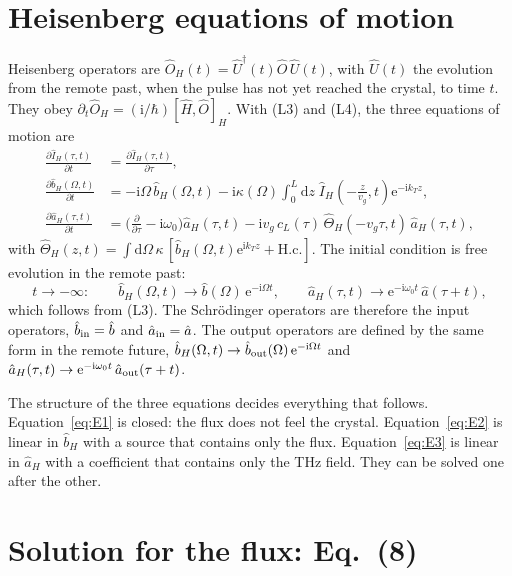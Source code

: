 \documentclass[aps,pra,onecolumn,notitlepage,11pt,amsmath,amssymb,nofootinbib]{revtex4-2}
\newcommand{\Iop}{\hat I}
\newcommand{\dd}{\mathrm{d}}
\newcommand{\ee}{\mathrm{e}}
\newcommand{\ii}{\mathrm{i}}
\begin{document}
\section{Heisenberg equations of motion}
\label{sec:eom}

Heisenberg operators are $\hat O_H(t)=\hat U^\dagger(t)\hat O\,\hat U(t)$, with
$\hat U(t)$ the evolution from the remote past, when the pulse has not yet
reached the crystal, to time $t$. They obey
$\partial_t\hat O_H=(\ii/\hbar)[\hat H,\hat O]_H$. With (L3) and (L4), the
three equations of motion are
\begin{align}
\frac{\partial\Iop_H(\tau,t)}{\partial t}
&=\frac{\partial\Iop_H(\tau,t)}{\partial\tau},
\label{eq:E1}\\
\frac{\partial\hat b_H(\Omega,t)}{\partial t}
&=-\ii\Omega\,\hat b_H(\Omega,t)
-\ii\kappa(\Omega)\int_0^L\!\!\dd z\;\Iop_H\!\left(-\frac{z}{v_g},t\right)\ee^{-\ii k_Tz},
\label{eq:E2}\\
\frac{\partial\hat a_H(\tau,t)}{\partial t}
&=\Big(\frac{\partial}{\partial\tau}-\ii\omega_0\Big)\hat a_H(\tau,t)
-\ii v_g\,c_L(\tau)\,\hat\Theta_H(-v_g\tau,t)\,\hat a_H(\tau,t),
\label{eq:E3}
\end{align}
with
$\hat\Theta_H(z,t)=\int\dd\Omega\,\kappa\,[\hat b_H(\Omega,t)\ee^{\ii k_Tz}+\mathrm{H.c.}]$.
The initial condition is free evolution in the remote past:
\begin{equation}
t\to-\infty:\qquad\hat b_H(\Omega,t)\to\hat b(\Omega)\,\ee^{-\ii\Omega t},\qquad
\hat a_H(\tau,t)\to\ee^{-\ii\omega_0t}\,\hat a(\tau+t),
\label{eq:past}
\end{equation}
which follows from (L3). The Schr\"odinger operators are therefore the input
operators, $\hat b_{\rm in}=\hat b$ and $\hat a_{\rm in}=\hat a$. The output
operators are defined by the same form in the remote future,
$\hat b_H(\Omega,t)\to\hat b_{\rm out}(\Omega)\,\ee^{-\ii\Omega t}$ and
$\hat a_H(\tau,t)\to\ee^{-\ii\omega_0t}\,\hat a_{\rm out}(\tau+t)$.

The structure of the three equations decides everything that follows.
Equation~\eqref{eq:E1} is closed: the flux does not feel the crystal.
Equation~\eqref{eq:E2} is linear in $\hat b_H$ with a source that contains
only the flux. Equation~\eqref{eq:E3} is linear in $\hat a_H$ with a
coefficient that contains only the THz field. They can be solved one after
the other.

\section{Solution for the flux: Eq.~(8)}
\label{sec:flux}
\end{document}

